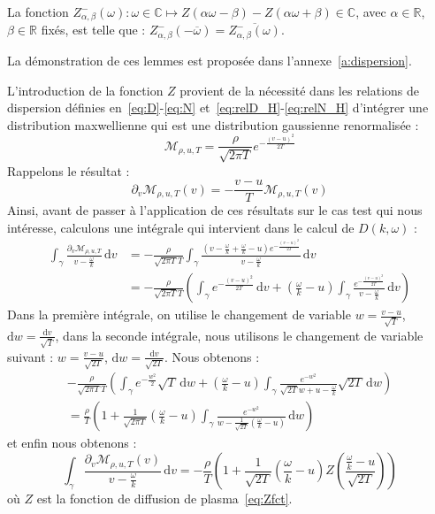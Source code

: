 \begin{lemma}
  La fonction $Z_{\alpha,\beta}^-(\omega):\omega\in\mathbb{C}\mapsto Z\left(\alpha\omega-\beta\right)-Z\left(\alpha\omega+\beta\right)\in\mathbb{C}$, avec $\alpha\in\mathbb{R}$, $\beta\in\mathbb{R}$ fixés, est telle que : $Z_{\alpha,\beta}^-\left(-\overline{\omega}\right)=\overline{Z_{\alpha,\beta}^-(\omega)}$.
  \label{lemma:Z-}
\end{lemma}

La démonstration de ces lemmes est proposée dans l'annexe~\ref{a:dispersion}.

L'introduction de la fonction $Z$ provient de la nécessité dans les relations de dispersion définies en~\eqref{eq:D}-\eqref{eq:N} et~\eqref{eq:relD_H}-\eqref{eq:relN_H} d'intégrer une distribution maxwellienne qui est une distribution gaussienne renormalisée :
$$
  \mathcal{M}_{\rho,u,T} = \frac{\rho}{\sqrt{2\pi T}}e^{-\frac{(v-u)^2}{2T}}
$$
Rappelons le résultat :
$$
  \partial_v \mathcal{M}_{\rho,u,T}(v) = -\frac{v-u}{T}\mathcal{M}_{\rho,u,T}(v)
$$
Ainsi, avant de passer à l'application de ces résultats sur le cas test qui nous intéresse, calculons une intégrale qui intervient dans le calcul de $D(k,\omega)$ :
$$
  \begin{aligned}
    \int_\gamma \frac{\partial_v\mathcal{M}_{\rho,u,T}}{v-\frac{\omega}{k}}\,\mathrm{d}v 
      & = -\frac{\rho}{\sqrt{2\pi T}T}\int_\gamma \frac{(v-\frac{\omega}{k} + \frac{\omega}{k}-u)e^{-\frac{(v-u)^2}{2T}}}{v-\frac{\omega}{k}}\,\mathrm{d}v \\
      & = -\frac{\rho}{\sqrt{2\pi T}T}\left( \int_\gamma e^{-\frac{(v-u)^2}{2T}}\,\mathrm{d}v + \left(\frac{\omega}{k}-u\right)\int_\gamma \frac{e^{-\frac{(v-u)^2}{2T}}}{v-\frac{\omega}{k}}\,\mathrm{d}v \right)
  \end{aligned}
$$
Dans la première intégrale, on utilise le changement de variable $w = \frac{v-u}{\sqrt{T}}$, $\mathrm{d}w = \frac{\mathrm{d}v}{\sqrt{T}}$, dans la seconde intégrale, nous utilisons le changement de variable suivant : $w=\frac{v-u}{\sqrt{2T}}$, $\mathrm{d}w = \frac{\mathrm{d}v}{\sqrt{2T}}$. Nous obtenons :
$$
  \begin{aligned}
    -\frac{\rho}{\sqrt{2\pi T}T}\left( \int_\gamma e^{-\frac{w^2}{2}}\sqrt{T}\,\mathrm{d}w + \left(\frac{\omega}{k}-u\right)\int_\gamma \frac{e^{-w^2}}{\sqrt{2T}w + u - \frac{\omega}{k}}\sqrt{2T}\,\mathrm{d}w \right) \\
    = \frac{\rho}{T}\left( 1 + \frac{1}{\sqrt{2\pi T}}\left(\frac{\omega}{k}-u\right)\int_\gamma \frac{e^{-w^2}}{w-\frac{1}{\sqrt{2T}}\left(\frac{\omega}{k}-u\right)}\,\mathrm{d}w \right)
  \end{aligned}
$$
et enfin nous obtenons :
\begin{equation}
  \int_\gamma \frac{\partial_v \mathcal{M}_{\rho,u,T}(v)}{v-\frac{\omega}{k}}\,\mathrm{d}v
    = -\frac{\rho}{T}\left( 1 + \frac{1}{\sqrt{2T}}\left(\frac{\omega}{k}-u\right)Z\left(\frac{\frac{\omega}{k}-u}{\sqrt{2T}}\right) \right)
    \label{eq:intforM}
\end{equation}
où $Z$ est la fonction de diffusion de plasma~\eqref{eq:Zfct}.

